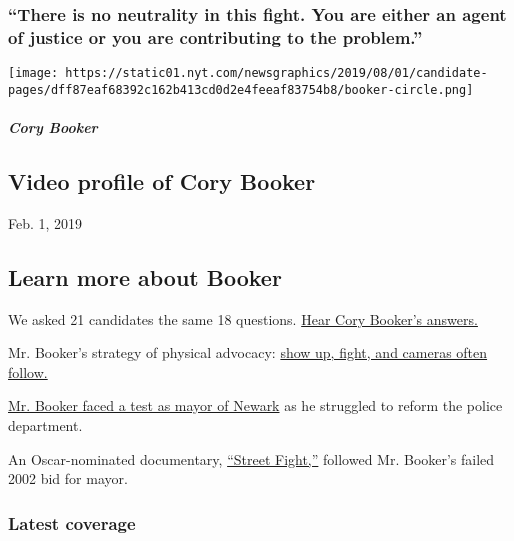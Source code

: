 \hypertarget{there-is-no-neutrality-in-this-fight-you-are-either-an-agent-of-justice-or-you-are-contributing-to-the-problem}{%
\subsubsection{``There is no neutrality in this fight. You are either an
agent of justice or you are contributing to the
problem.''}\label{there-is-no-neutrality-in-this-fight-you-are-either-an-agent-of-justice-or-you-are-contributing-to-the-problem}}

\texttt{[image: https://static01.nyt.com/newsgraphics/2019/08/01/candidate-pages/dff87eaf68392c162b413cd0d2e4feeaf83754b8/booker-circle.png]}

\hypertarget{cory-booker-1}{%
\subparagraph{Cory Booker}\label{cory-booker-1}}

\hypertarget{video-profile-of-cory-booker}{%
\subsection{Video profile of Cory
Booker}\label{video-profile-of-cory-booker}}

Feb. 1, 2019

\hypertarget{learn-more-about-booker}{%
\subsection{Learn more about Booker}\label{learn-more-about-booker}}

We asked 21 candidates the same 18 questions.
\href{https://www.nytimes.com/interactive/2019/us/politics/cory-booker-2020-campaign.html}{Hear
Cory Booker's answers.}

Mr. Booker's strategy of physical advocacy:
\href{https://www.nytimes.com/2019/07/06/us/politics/cory-booker-tv-radio.html}{show
up, fight, and cameras often follow.}

\href{https://www.nytimes.com/2019/03/27/us/politics/cory-booker-2020-criminal-justice.html}{Mr.
Booker faced a test as mayor of Newark} as he struggled to reform the
police department.

An Oscar-nominated documentary,
\href{https://www.netflix.com/title/70044385}{``Street Fight,''}
followed Mr. Booker's failed 2002 bid for mayor.

\hypertarget{latest-coverage}{%
\subsubsection{Latest coverage}\label{latest-coverage}}

